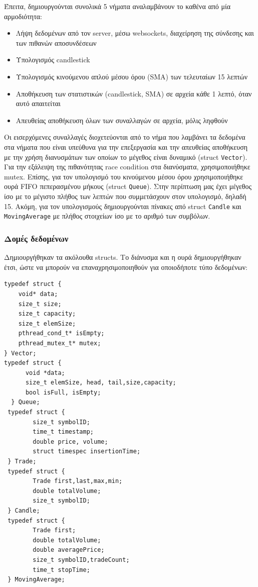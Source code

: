 \documentclass[11pt]{article}
\begin{document}
Έπειτα, δημιουργούνται συνολικά 5 νήματα αναλαμβάνουν το καθένα από μία αρμοδιότητα:
\begin{itemize}
\item Λήψη δεδομένων από τον server, μέσω websockets, διαχείρηση της σύνδεσης και των πιθανών αποσυνδέσεων
\item Υπολογισμός candlestick
\item Υπολογισμός κινούμενου απλού μέσου όρου (SMA) των τελευταίων 15 λεπτών
\item Αποθήκευση των στατιστικών (candlestick, SMA) σε αρχεία κάθε 1 λεπτό, όταν αυτό απαιτείται
\item Απευθείας αποθήκευση όλων των συναλλαγών σε αρχεία, μόλις ληφθούν
\end{itemize}

Οι εισερχόμενες συναλλαγές διοχετεύονται από το νήμα που λαμβάνει τα δεδομένα στα νήματα που είναι υπεύθυνα για την επεξεργασία και την απευθείας αποθήκευση με την χρήση διανυσμάτων των οποίων το μέγεθος είναι δυναμικό (struct \texttt{Vector}). Για την εξάλειψη της πιθανότητας race condition στα διανύσματα, χρησιμοποιήθηκε mutex. Επίσης, για τον υπολογισμό του κινούμενου μέσου όρου χρησιμοποιήθηκε ουρά FIFO πεπερασμένου μήκους (struct \texttt{Queue}). Στην περίπτωση μας έχει μέγεθος ίσο με το μέγιστο πλήθος των λεπτών που συμμετάσχουν στον υπολογισμό, δηλαδή 15. Ακόμη, για τον υπολογισμούς δημιουργούνται πίνακες από struct \texttt{Candle} και \texttt{MovingAverage} με πλήθος στοιχείων ίσο με το αριθμό των συμβόλων.

\subsubsection{Δομές δεδομένων}
\label{sec:org2014847}
Δημιουργήθηκαν τα ακόλουθα structs. Το διάνυσμα και η ουρά δημιουργήθηκαν έτσι, ώστε να μπορούν να επαναχρησιμοποιηθούν για οποιοδήποτε τύπο δεδομένων:
\begin{verbatim}
typedef struct {
    void* data;
    size_t size;
    size_t capacity;
    size_t elemSize;
    pthread_cond_t* isEmpty;
    pthread_mutex_t* mutex;
} Vector;
typedef struct {
      void *data;
      size_t elemSize, head, tail,size,capacity;
      bool isFull, isEmpty;
  } Queue;
 typedef struct {
        size_t symbolID;
        time_t timestamp;
        double price, volume;
        struct timespec insertionTime;
 } Trade;
 typedef struct {
        Trade first,last,max,min;
        double totalVolume;
        size_t symbolID;
 } Candle;
 typedef struct {
        Trade first;
        double totalVolume;
        double averagePrice;
        size_t symbolID,tradeCount;
        time_t stopTime;
 } MovingAverage;
\end{verbatim}
\end{document}
